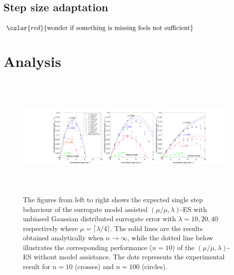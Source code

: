 \subsection{Step size adaptation}



$\color{red}{\text{wonder if something is missing feels not sufficient}}$



\section{Analysis}
\begin{center}
\begin{figure}
\includegraphics[height=2.4in, width=6.1in]{expectedFitGain_v1}
\caption{The figures from left to right shows the expected single step behaviour of the surrogate model assisted $(\mu/\mu,\lambda)$-ES with unbiased Gaussian distributed surrogate error with $\lambda=10,20,40$ respectively where $\mu = \lceil \lambda/4 \rceil$. The solid lines are the results obtained analytically when $n \rightarrow \infty$, while the dotted line below illustrates the corresponding performance ($n=10$) of the $(\mu/\mu,\lambda)$-ES without model assistance. The dots represents the experimental result for $n=10$ (crosses) and $n=100$ (circles).}
\label{fig:expectedFitGain}
\end{figure}
\end{center}


